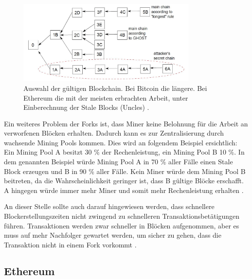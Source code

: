 \begin{figure}[!htbp]
  \centering
    \includegraphics[width=0.8\textwidth,angle=0]{images/forking-risks}
     \caption{Auswahl der gültigen Blockchain. Bei Bitcoin die längere. Bei Ethereum die mit der meisten erbrachten Arbeit, unter Einberechnung der Stale Blocks (Uncles) \cite{SompolinskyAcceleratingBitcoinTransaction2013}.}
    \label{fig:forking-risks}
\end{figure} 

Ein weiteres Problem der Forks ist, dass Miner keine Belohnung für die Arbeit an verworfenen Blöcken erhalten. Dadurch kann es zur Zentralisierung durch wachsende Mining Pools kommen. Dies wird an folgendem Beispiel ersichtlich: Ein Mining Pool A besitzt 30 \% der Rechenleistung, ein Mining Pool B 10 \%. In dem genannten Beispiel würde Mining Pool A in 70 \% aller Fälle einen Stale Block erzeugen und B in 90 \% aller Fälle. Kein Miner würde dem Mining Pool B beitreten, da die Wahrscheinlichkeit geringer ist, dass B gültige Blöcke erschafft. A hingegen würde immer mehr Miner und somit mehr Rechenleistung erhalten \cite{EthereumTeamEthereumWhitePaper2017}.

An dieser Stelle sollte auch darauf hingewiesen werden, dass schnellere Blockerstellungszeiten nicht zwingend zu schnelleren Transaktionsbetätigungen führen. Transaktionen werden zwar schneller in Blöcken aufgenommen, aber es muss auf mehr Nachfolger gewartet werden, um sicher zu gehen, dass die Transaktion nicht in einem Fork vorkommt \cite{SchererPerformanceScalabilityBlockchain2017}.

\subsection{Ethereum}

